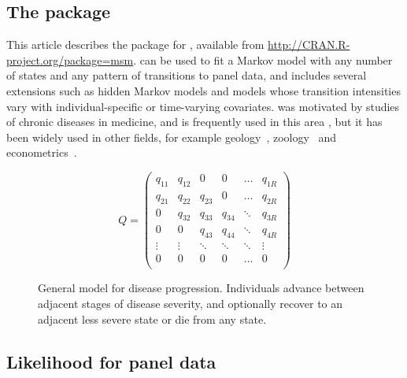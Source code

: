 \documentclass[article,shortnames]{jss}
\begin{document}
\subsection[The msm package]{The  package}

This article describes the  package for 
\citep{R}, available from \url{http://CRAN.R-project.org/package=msm}.
 can be used to fit a Markov model with any number of states
and any pattern of transitions to panel data, and includes several
extensions such as hidden Markov models and models whose transition
intensities vary with individual-specific or time-varying covariates.
 was motivated by studies of chronic diseases in medicine,
and is frequently used in this area
\citep{jackson03:_multis_markov,my:cav,my:heron,sweeting2006epr,buter2008das,eirik:msm},
but it has been widely used in other fields, for example
geology~\citep{aspinall}, zoology~\citep{gautrais2007asm} and
econometrics~\citep{rummel}.

\begin{figure}[htbp]
  \centering
  \vskip 1cm
    \[
    Q = \left(
      \begin{array}{llllll}
        q_{11} & q_{12} & 0 & 0 & \ldots & q_{1R}\\
        q_{21} & q_{22} & q_{23} & 0 & \ldots & q_{2R}\\
        0 & q_{32} & q_{33} & q_{34} & \ddots & q_{3R}\\
        0 & 0 & q_{43} & q_{44} & \ddots & q_{4R}\\
        \vdots & \vdots & \ddots & \ddots & \ddots & \vdots\\
        0 & 0 & 0 & 0 & \ldots & 0\\
      \end{array}
    \right )
    \]
  \caption{\label{fig:disease}General model for disease progression. Individuals advance between adjacent stages of disease severity, and optionally recover to an adjacent less severe state or die from any state.}
  \end{figure}


\subsection{Likelihood for panel data}
\label{sec:lik}
\end{document}

